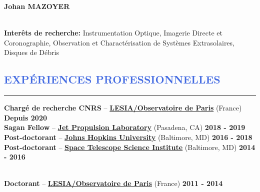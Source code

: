 \documentclass[11pt, a4paper, french]{article}
\begin{document}
\lfoot{\textcolor{Gray}{CV mis à jour en \monthyeardate\today}}

\begin{huge}
\noindent\textbf{Johan MAZOYER}
\end{huge}\\

\textbf{Interêts de recherche:} Instrumentation Optique, Imagerie Directe et Coronographie,
Observation et Charactérisation de Systèmes Extrasolaires, Disques de Débris\\





\vspace{-0.8cm}
\textcolor{RoyalBlue}{\section{\large EXPÉRIENCES PROFESSIONNELLES}
\vspace{-0.2cm}\hrule}
\vspace{0.4cm}


\textbf{Chargé de recherche CNRS} --
\href{http://www.obspm.fr}{\textbf{LESIA/Observatoire de Paris}} (France)
\hfill     	 { \bf Depuis 2020}\\

\vspace{-0.05cm}
\textbf{Sagan Fellow} --
\href{https://www.jpl.nasa.gov/}{\textbf{Jet Propulsion Laboratory}} (Pasadena, CA)
\hfill      { \bf 2018 - 2019}\\

\vspace{-0.05cm}
\textbf{Post-doctorant} --
\href{http://physics-astronomy.jhu.edu/}{\textbf{Johns Hopkins University}} (Baltimore, MD)
\hfill   	 { \bf 2016 - 2018}\\

\vspace{-0.05cm}
\textbf{Post-doctorant} --
\href{http://www.stsci.edu}{\textbf{Space Telescope Science Institute}} (Baltimore, MD)
\hfill        { \bf 2014 - 2016}\\\

\vspace{-0.05cm}
\textbf{Doctorant} --
\href{http://www.obspm.fr/}{\textbf{LESIA/Observatoire de Paris}} (France)
\hfill        { \bf 2011 - 2014}\\
\end{document}
